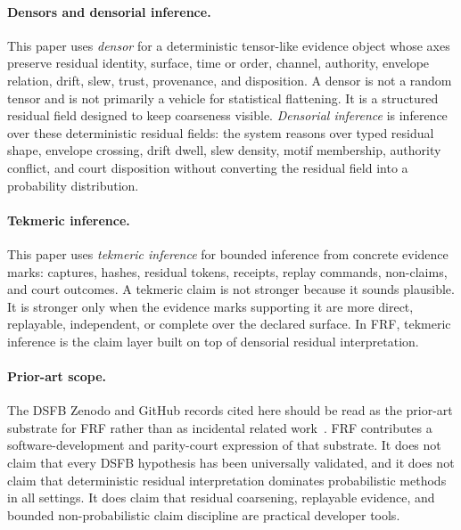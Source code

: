 \documentclass[11pt,a4paper]{article}
\newcommand{\frf}{\textsc{FRF}}
\newcommand{\dsfb}{\textsc{DSFB}}
\begin{document}
\paragraph{Densors and densorial inference.}
This paper uses \emph{densor} for a deterministic tensor-like evidence object whose axes preserve residual identity, surface, time or order, channel, authority, envelope relation, drift, slew, trust, provenance, and disposition. A densor is not a random tensor and is not primarily a vehicle for statistical flattening. It is a structured residual field designed to keep coarseness visible. \emph{Densorial inference} is inference over these deterministic residual fields: the system reasons over typed residual shape, envelope crossing, drift dwell, slew density, motif membership, authority conflict, and court disposition without converting the residual field into a probability distribution.

\paragraph{Tekmeric inference.}
This paper uses \emph{tekmeric inference} for bounded inference from concrete evidence marks: captures, hashes, residual tokens, receipts, replay commands, non-claims, and court outcomes. A tekmeric claim is not stronger because it sounds plausible. It is stronger only when the evidence marks supporting it are more direct, replayable, independent, or complete over the declared surface. In \frf{}, tekmeric inference is the claim layer built on top of densorial residual interpretation.

\paragraph{Prior-art scope.}
The \dsfb{} Zenodo and GitHub records cited here should be read as the prior-art substrate for \frf{} rather than as incidental related work~\cite{dsfbdebug,dsfbforensics,dsfbdatabase,dsfbgray,dsfbzenodo20088863,dsfbzenodo19446580,dsfbzenodo18642887,dsfbzenodo18706455,dsfbzenodo18783283,dsfbzenodo19028440,dsfbzenodo19410569,dsfbzenodo19382012,dsfbzenodo19204366}. \frf{} contributes a software-development and parity-court expression of that substrate. It does not claim that every \dsfb{} hypothesis has been universally validated, and it does not claim that deterministic residual interpretation dominates probabilistic methods in all settings. It does claim that residual coarsening, replayable evidence, and bounded non-probabilistic claim discipline are practical developer tools.
\end{document}
